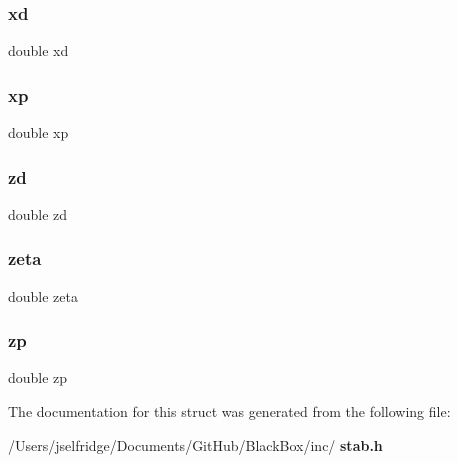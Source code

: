 \mbox{\label{structsf__struct_ac31dbf5a1e5a7b11dd768b608b23f2e3}} 
\subsubsection{xd}
{\footnotesize\ttfamily double xd}

\mbox{\label{structsf__struct_af649efec4c4f51f4db0ebb935a83d015}} 
\subsubsection{xp}
{\footnotesize\ttfamily double xp}

\mbox{\label{structsf__struct_a8b4893cb36a923ad64996faad5bda8cd}} 
\subsubsection{zd}
{\footnotesize\ttfamily double zd}

\mbox{\label{structsf__struct_a8f6f585de6034223a83ef39a56fad29d}} 
\subsubsection{zeta}
{\footnotesize\ttfamily double zeta}

\mbox{\label{structsf__struct_a81db37a1ed8f6f9230ac05ea89156b8d}} 
\subsubsection{zp}
{\footnotesize\ttfamily double zp}



The documentation for this struct was generated from the following file\+:\begin{DoxyCompactItemize}
\item 
/\+Users/jselfridge/\+Documents/\+Git\+Hub/\+Black\+Box/inc/\textbf{ stab.\+h}\end{DoxyCompactItemize}

